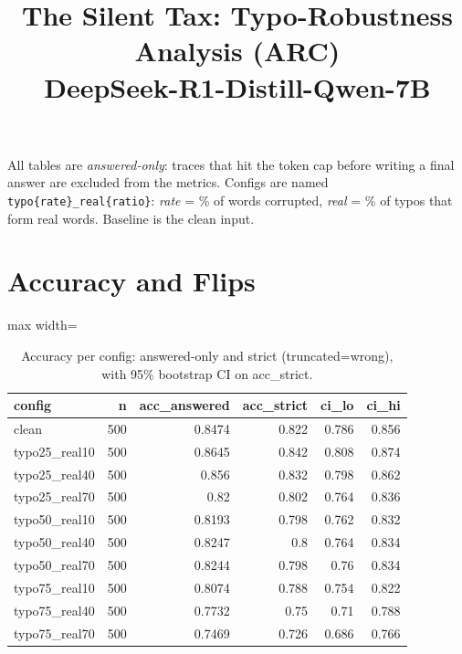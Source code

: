 \documentclass[11pt]{article}
\title{The Silent Tax: Typo-Robustness Analysis (ARC)\\\large DeepSeek-R1-Distill-Qwen-7B}
\date{}
\begin{document}
\maketitle
\noindent All tables are \emph{answered-only}: traces that hit the token cap before writing a final answer are excluded from the metrics. Configs are named \texttt{typo\{rate\}\_real\{ratio\}}: \emph{rate} = \% of words corrupted, \emph{real} = \% of typos that form real words. Baseline is the clean input.

\section*{Accuracy and Flips}
\begin{table}[H]
\centering
\caption{Accuracy per config: answered-only and strict (truncated=wrong), with 95\% bootstrap CI on acc\_strict.}
\small
\begin{adjustbox}{max width=\textwidth}
\begin{tabular}{lrrrrr}
\toprule
\textbf{config} & \textbf{n} & \textbf{acc\_answered} & \textbf{acc\_strict} & \textbf{ci\_lo} & \textbf{ci\_hi} \\
\midrule
clean & 500 & 0.8474 & 0.822 & 0.786 & 0.856 \\
typo25\_real10 & 500 & 0.8645 & 0.842 & 0.808 & 0.874 \\
typo25\_real40 & 500 & 0.856 & 0.832 & 0.798 & 0.862 \\
typo25\_real70 & 500 & 0.82 & 0.802 & 0.764 & 0.836 \\
typo50\_real10 & 500 & 0.8193 & 0.798 & 0.762 & 0.832 \\
typo50\_real40 & 500 & 0.8247 & 0.8 & 0.764 & 0.834 \\
typo50\_real70 & 500 & 0.8244 & 0.798 & 0.76 & 0.834 \\
typo75\_real10 & 500 & 0.8074 & 0.788 & 0.754 & 0.822 \\
typo75\_real40 & 500 & 0.7732 & 0.75 & 0.71 & 0.788 \\
typo75\_real70 & 500 & 0.7469 & 0.726 & 0.686 & 0.766 \\
\bottomrule
\end{tabular}
\end{adjustbox}
\end{table}
\end{document}
